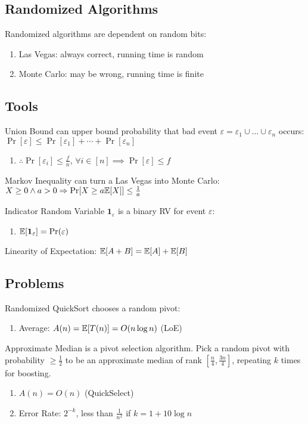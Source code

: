 \documentclass[12pt, a4paper]{article}
\begin{document}
\begin{multicols*}{3}
\section{Randomized Algorithms} 
Randomized algorithms are dependent on random bits:
\begin{enumerate}[label=\roman*.]
  \item Las Vegas: always correct, running time is random
  \item Monte Carlo: may be wrong, running time is finite
\end{enumerate}

\subsection{Tools}
Union Bound can upper bound probability that bad event $\varepsilon = \varepsilon_1 \cup \dots \cup \varepsilon_n$ occurs: $\Pr[\varepsilon] \leq \Pr[\varepsilon_1] + \cdots + \Pr[\varepsilon_n]$
\begin{enumerate}[\roman*.]
  \item $\therefore \Pr[\varepsilon_i] \leq \frac{f}{n}$, $\forall i \in [n] \implies \Pr[\varepsilon] \leq f$ 
\end{enumerate}

Markov Inequality can turn a Las Vegas into Monte Carlo: $X \geq 0 \land a > 0 \Rightarrow \Pr[X\geq a \mathbb{E}[X]] \leq \frac{1}{a}$

Indicator Random Variable $\mathbf{1}_\varepsilon$ is a binary RV for event $\varepsilon$:
\begin{enumerate}[\roman*.]
  \item $\mathbb{E}[\mathbf{1}_\varepsilon] = \Pr(\varepsilon)$
\end{enumerate}

Linearity of Expectation: $\mathbb{E}[A+B] = \mathbb{E}[A] + \mathbb{E}[B]$

\colbreak
\subsection{Problems} %

Randomized QuickSort chooses a random pivot:
\begin{enumerate}[\roman*.]
  \item Average: $A(n) = \mathbb{E}[T(n)] = O(n\log n)$ (LoE)
\end{enumerate}

Approximate Median is a pivot selection algorithm. Pick a random pivot with probability $ \geq \frac{1}{2}$ to be an approximate median of rank $[\frac{n}{4}, \frac{3n}{4}]$, repeating $k$ times for boosting.
\begin{enumerate}[\roman*.]
  \item $A(n) = O(n)$ (QuickSelect)
  \item Error Rate: $2^{-k}$, less than $\frac{1}{n^2}$ if $k=1+10\log n$
\end{enumerate}



\end{multicols*}
\end{document}

